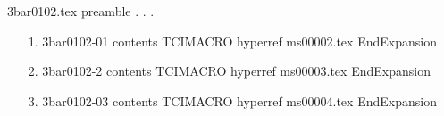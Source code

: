 3bar0102.tex preamble
.
.
.
\begin{enumerate}
\item[1.]
3bar0102-01 contents
TCIMACRO
hyperref ms00002.tex
EndExpansion
\item[2.]
3bar0102-2 contents
TCIMACRO
hyperref ms00003.tex
EndExpansion
\item[3.]
3bar0102-03 contents
TCIMACRO
hyperref ms00004.tex
EndExpansion
\end{enumerate}
